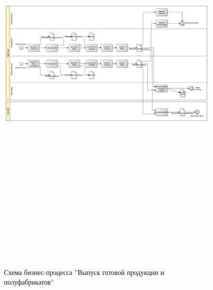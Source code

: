 \begin{figure}[!htb]
\centering
  \includegraphics[width=200mm, height=220mm, angle=90, keepaspectratio]{50_Pics/4_Output.pdf}
\caption{Схема бизнес-процесса ''Выпуск готовой продукции и полуфабрикатов''}
\label{pic:4_Output}
\end{figure} 


